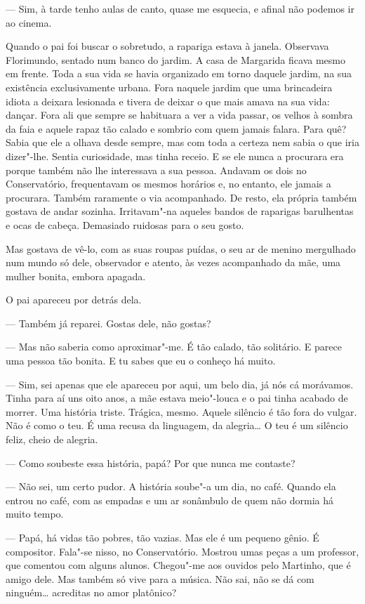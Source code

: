 --- Sim, à tarde tenho aulas de canto, quase me esquecia, e afinal não
podemos ir ao cinema.

Quando o pai foi buscar o sobretudo, a rapariga estava à janela.
Observava Florimundo, sentado num banco do jardim. A casa de Margarida
ficava mesmo em frente. Toda a sua vida se havia organizado em torno
daquele jardim, na sua existência exclusivamente urbana. Fora naquele
jardim que uma brincadeira idiota a deixara lesionada e tivera de deixar
o que mais amava na sua vida: dançar. Fora ali que sempre se habituara a
ver a vida passar, os velhos à sombra da faia e aquele rapaz tão calado
e sombrio com quem jamais falara. Para quê? Sabia que ele a olhava desde
sempre, mas com toda a certeza nem sabia o que iria dizer"-lhe. Sentia
curiosidade, mas tinha receio. E se ele nunca a procurara era porque
também não lhe interessava a sua pessoa. Andavam os dois no
Conservatório, frequentavam os mesmos horários e, no entanto, ele jamais
a procurara. Também raramente o via acompanhado. De resto, ela própria
também gostava de andar sozinha. Irritavam"-na aqueles bandos de
raparigas barulhentas e ocas de cabeça. Demasiado ruidosas para o seu
gosto.

Mas gostava de vê-lo, com as suas roupas puídas, o seu ar de menino
mergulhado num mundo só dele, observador e atento, às vezes acompanhado
da mãe, uma mulher bonita, embora apagada.

O pai apareceu por detrás dela.

--- Também já reparei. Gostas dele, não gostas?

--- Mas não saberia como aproximar"-me. É tão calado, tão solitário. E
parece uma pessoa tão bonita. E tu sabes que eu o conheço há muito.

--- Sim, sei apenas que ele apareceu por aqui, um belo dia, já nós cá
morávamos. Tinha para aí uns oito anos, a mãe estava meio"-louca e o pai
tinha acabado de morrer. Uma história triste. Trágica, mesmo. Aquele
silêncio é tão fora do vulgar. Não é como o teu. É uma recusa da
linguagem, da alegria\ldots{} O teu é um silêncio feliz, cheio de alegria.

--- Como soubeste essa história, papá? Por que nunca me contaste?

--- Não sei, um certo pudor. A história soube"-a um dia, no café. Quando
ela entrou no café, com as empadas e um ar sonâmbulo de quem não dormia
há muito tempo.

--- Papá, há vidas tão pobres, tão vazias. Mas ele é um pequeno gênio. É
compositor. Fala"-se nisso, no Conservatório. Mostrou umas peças a um
professor, que comentou com alguns alunos. Chegou"-me aos ouvidos pelo
Martinho, que é amigo dele. Mas também só vive para a música. Não sai,
não se dá com ninguém\ldots{} acreditas no amor platônico?

